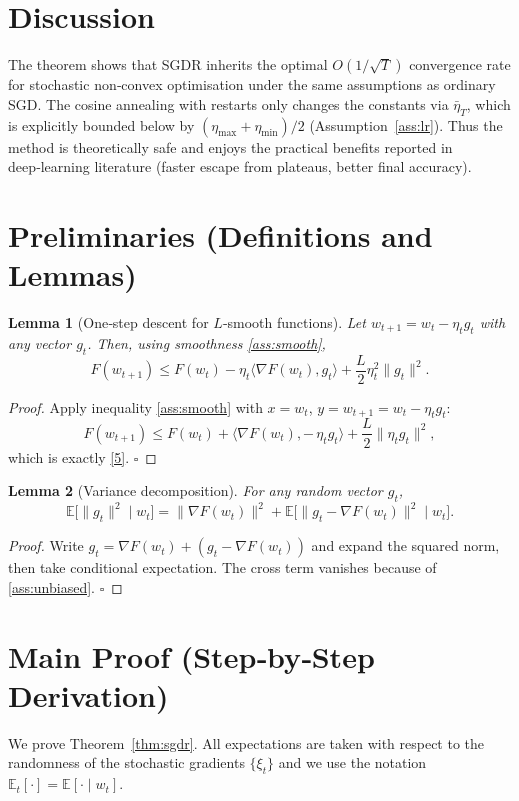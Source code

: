 \documentclass{article}
\newtheorem{lemma}{Lemma}
\newcommand{\EE}{\mathbb{E}}
\begin{document}
\section*{Discussion}
The theorem shows that SGDR inherits the optimal $O(1/\sqrt{T})$ convergence rate
for stochastic non‑convex optimisation under the same assumptions as ordinary
SGD. The cosine annealing with restarts only changes the constants via
$\bar\eta_T$, which is explicitly bounded below by
$(\eta_{\max}+\eta_{\min})/2$ (Assumption~\ref{ass:lr}). Thus the method is
theoretically safe and enjoys the practical benefits reported in deep‑learning
literature (faster escape from plateaus, better final accuracy).

\newpage
\section*{Preliminaries (Definitions and Lemmas)}
\begin{lemma}[One‑step descent for $L$‑smooth functions]\label{lem:descent}
Let $w_{t+1}=w_t-\eta_t g_t$ with any vector $g_t$. Then, using smoothness \eqref{ass:smooth},
\[
F(w_{t+1})\le F(w_t)-\eta_t\langle\nabla F(w_t),g_t\rangle
+\frac{L}{2}\eta_t^{2}\|g_t\|^{2}. \tag{5}
\]
\end{lemma}
\begin{proof}
Apply inequality \eqref{ass:smooth} with $x=w_t$, $y=w_{t+1}=w_t-\eta_t g_t$:
\[
F(w_{t+1})\le F(w_t)+\langle\nabla F(w_t),-\,\eta_t g_t\rangle
+\frac{L}{2}\|\eta_t g_t\|^{2},
\]
which is exactly \eqref{5}. \hfill $\square$
\end{proof}

\begin{lemma}[Variance decomposition]\label{lem:var}
For any random vector $g_t$,
\[
\EE\bigl[\|g_t\|^{2}\mid w_t\bigr]
= \|\nabla F(w_t)\|^{2}
+ \EE\bigl[\|g_t-\nabla F(w_t)\|^{2}\mid w_t\bigr].
\tag{6}
\]
\end{lemma}
\begin{proof}
Write $g_t=\nabla F(w_t)+(g_t-\nabla F(w_t))$ and expand the squared norm,
then take conditional expectation. The cross term vanishes because of
\eqref{ass:unbiased}. \hfill $\square$
\end{proof}

\section*{Main Proof (Step‑by‑Step Derivation)}
We prove Theorem~\ref{thm:sgdr}.  
All expectations are taken with respect to the randomness of the stochastic
gradients $\{\xi_t\}$ and we use the notation $\EE_t[\cdot]=\EE[\cdot\mid w_t]$.
\end{document}
